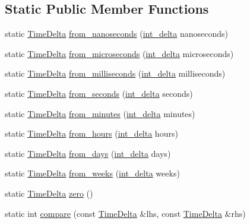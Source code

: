 \subsection*{\-Static \-Public \-Member \-Functions}
\begin{DoxyCompactItemize}
\item 
static \hyperlink{structTimeDelta}{\-Time\-Delta} \hyperlink{structTimeDelta_abc1b517c2156b2d9627fd07d42aecb2f}{from\-\_\-nanoseconds} (\hyperlink{types_8h_a10729255b1946fd4fb654b2fe814910b}{int\-\_\-delta} nanoseconds)
\item 
static \hyperlink{structTimeDelta}{\-Time\-Delta} \hyperlink{structTimeDelta_a32f3fa21ba37d81507383d001f3b704b}{from\-\_\-microseconds} (\hyperlink{types_8h_a10729255b1946fd4fb654b2fe814910b}{int\-\_\-delta} microseconds)
\item 
static \hyperlink{structTimeDelta}{\-Time\-Delta} \hyperlink{structTimeDelta_a01e0919f444379030aa37559fa13542c}{from\-\_\-milliseconds} (\hyperlink{types_8h_a10729255b1946fd4fb654b2fe814910b}{int\-\_\-delta} milliseconds)
\item 
static \hyperlink{structTimeDelta}{\-Time\-Delta} \hyperlink{structTimeDelta_aad4311d8580ade36d8c567576630c967}{from\-\_\-seconds} (\hyperlink{types_8h_a10729255b1946fd4fb654b2fe814910b}{int\-\_\-delta} seconds)
\item 
static \hyperlink{structTimeDelta}{\-Time\-Delta} \hyperlink{structTimeDelta_a244bc3b143bfa760aa2b0cf350cf768c}{from\-\_\-minutes} (\hyperlink{types_8h_a10729255b1946fd4fb654b2fe814910b}{int\-\_\-delta} minutes)
\item 
static \hyperlink{structTimeDelta}{\-Time\-Delta} \hyperlink{structTimeDelta_a912f6ceafac4b9252a1a5d76033754ea}{from\-\_\-hours} (\hyperlink{types_8h_a10729255b1946fd4fb654b2fe814910b}{int\-\_\-delta} hours)
\item 
static \hyperlink{structTimeDelta}{\-Time\-Delta} \hyperlink{structTimeDelta_a9bb1a85b6f27ad8488ae06e238d5808e}{from\-\_\-days} (\hyperlink{types_8h_a10729255b1946fd4fb654b2fe814910b}{int\-\_\-delta} days)
\item 
static \hyperlink{structTimeDelta}{\-Time\-Delta} \hyperlink{structTimeDelta_ae0f0a41d899e62b9d17bc4542c443ec6}{from\-\_\-weeks} (\hyperlink{types_8h_a10729255b1946fd4fb654b2fe814910b}{int\-\_\-delta} weeks)
\item 
static \hyperlink{structTimeDelta}{\-Time\-Delta} \hyperlink{structTimeDelta_a2dec837a107c5e46e14b9c69557209fa}{zero} ()
\item 
static int \hyperlink{structTimeDelta_a1bee789870de5a374ee472ffa4bff172}{compare} (const \hyperlink{structTimeDelta}{\-Time\-Delta} \&lhs, const \hyperlink{structTimeDelta}{\-Time\-Delta} \&rhs)
\end{DoxyCompactItemize}
